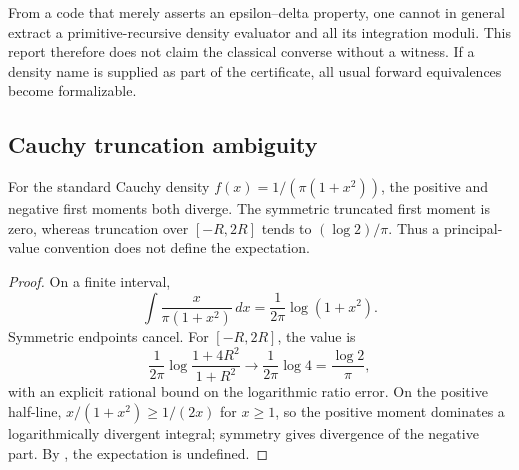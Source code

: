 \begin{remark}
From a code that merely asserts an epsilon--delta property, one cannot in
general extract a primitive-recursive density evaluator and all its integration
moduli.  This report therefore does not claim the classical converse without a
witness.  If a density name is supplied as part of the certificate, all usual
forward equivalences become formalizable.
\end{remark}

\subsection{Cauchy truncation ambiguity}

\begin{proposition}\label{prop:cauchy-trunc}
For the standard Cauchy density
\(f(x)=1/(\pi(1+x^2))\), the positive and negative first moments both diverge.
The symmetric truncated first moment is zero, whereas truncation over
\([-R,2R]\) tends to \((\log2)/\pi\).  Thus a principal-value convention does
not define the expectation.
\end{proposition}

\begin{proof}
On a finite interval,
\[
 \int \frac{x}{\pi(1+x^2)}\,dx
 =\frac{1}{2\pi}\log(1+x^2).
\]
Symmetric endpoints cancel.  For \([-R,2R]\), the value is
\[
 \frac{1}{2\pi}\log\frac{1+4R^2}{1+R^2}
 \longrightarrow\frac{1}{2\pi}\log4=\frac{\log2}{\pi},
\]
with an explicit rational bound on the logarithmic ratio error.  On the
positive half-line,
\(x/(1+x^2)\ge1/(2x)\) for \(x\ge1\), so the positive moment dominates a
logarithmically divergent integral; symmetry gives divergence of the negative
part.  By , the expectation is undefined.
\end{proof}
